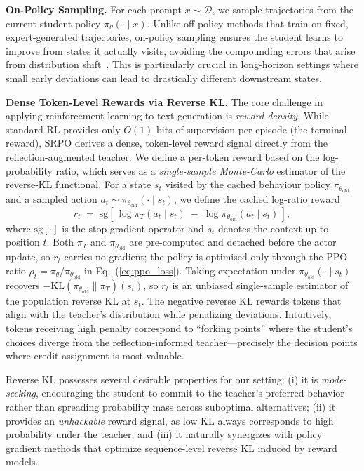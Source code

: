 \documentclass{article}
\theoremstyle{plain}
\theoremstyle{definition}
\theoremstyle{remark}
\begin{document}
\textbf{On-Policy Sampling.}
For each prompt $x\sim\mathcal{D}$, we sample trajectories from the current student policy $\pi_\theta(\cdot\mid x)$.
Unlike off-policy methods that train on fixed, expert-generated trajectories, on-policy sampling ensures the student learns to improve from states it actually visits, avoiding the compounding errors that arise from distribution shift~\cite{ross2011reductionimitationlearningstructured}.
This is particularly crucial in long-horizon settings where small early deviations can lead to drastically different downstream states.

\textbf{Dense Token-Level Rewards via Reverse KL.}
The core challenge in applying reinforcement learning to text generation is \emph{reward density}.
While standard RL provides only $O(1)$ bits of supervision per episode (the terminal reward), SRPO derives a dense, token-level reward signal directly from the reflection-augmented teacher.
We define a per-token reward based on the log-probability ratio, which serves as a \emph{single-sample Monte-Carlo} estimator of the reverse-KL functional. For a state $s_t$ visited by the cached behaviour policy $\pi_{\theta_{\mathrm{old}}}$ and a sampled action $a_t\sim\pi_{\theta_{\mathrm{old}}}(\cdot\mid s_t)$, we define the cached log-ratio reward
\begin{equation}
r_t \;=\; \mathrm{sg}\!\left[\,\log\pi_T(a_t\mid s_t)\;-\;\log\pi_{\theta_{\mathrm{old}}}(a_t\mid s_t)\,\right],
\label{eq:token_reward}
\end{equation}
where $\mathrm{sg}[\cdot]$ is the stop-gradient operator and $s_t$ denotes the context up to position $t$. Both $\pi_T$ and $\pi_{\theta_{\mathrm{old}}}$ are pre-computed and detached before the actor update, so $r_t$ carries no gradient; the policy is optimised only through the PPO ratio $\rho_t=\pi_\theta/\pi_{\theta_{\mathrm{old}}}$ in Eq.~(\ref{eq:ppo_loss}). Taking expectation under $\pi_{\theta_{\mathrm{old}}}(\cdot\mid s_t)$ recovers $-\mathrm{KL}\!\left(\pi_{\theta_{\mathrm{old}}}\!\parallel\!\pi_T\right)(s_t)$, so $r_t$ is an unbiased single-sample estimator of the population reverse KL at $s_t$.
The negative reverse KL rewards tokens that align with the teacher's distribution while penalizing deviations.
Intuitively, tokens receiving high penalty correspond to ``forking points'' where the student's choices diverge from the reflection-informed teacher—precisely the decision points where credit assignment is most valuable.

Reverse KL possesses several desirable properties for our setting:
(i) it is \emph{mode-seeking}, encouraging the student to commit to the teacher's preferred behavior rather than spreading probability mass across suboptimal alternatives;
(ii) it provides an \emph{unhackable} reward signal, as low KL always corresponds to high probability under the teacher; and
(iii) it naturally synergizes with policy gradient methods that optimize sequence-level reverse KL induced by reward models.
\end{document}
